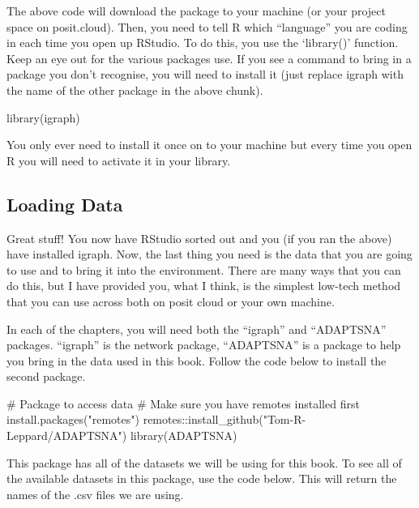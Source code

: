 \documentclass[
  letterpaper,
  DIV=11,
  numbers=noendperiod]{scrreprt}
\newenvironment{Shaded}{\begin{snugshade}}{\end{snugshade}}
\newcommand{\CommentTok}[1]{\textcolor[rgb]{0.37,0.37,0.37}{#1}}
\newcommand{\FunctionTok}[1]{\textcolor[rgb]{0.28,0.35,0.67}{#1}}
\newcommand{\NormalTok}[1]{\textcolor[rgb]{0.00,0.23,0.31}{#1}}
\newcommand{\SpecialCharTok}[1]{\textcolor[rgb]{0.37,0.37,0.37}{#1}}
\newcommand{\StringTok}[1]{\textcolor[rgb]{0.13,0.47,0.30}{#1}}
\begin{document}
The above code will download the package to your machine (or your
project space on posit.cloud). Then, you need to tell R which
``language'' you are coding in each time you open up RStudio. To do
this, you use the `library()' function. Keep an eye out for the various
packages use. If you see a command to bring in a package you don't
recognise, you will need to install it (just replace igraph with the
name of the other package in the above chunk).

\begin{Shaded}
\begin{Highlighting}[]
\FunctionTok{library}\NormalTok{(igraph)}
\end{Highlighting}
\end{Shaded}

You only ever need to install it once on to your machine but every time
you open R you will need to activate it in your library.

\subsection{Loading Data}\label{loading-data}

Great stuff! You now have RStudio sorted out and you (if you ran the
above) have installed igraph. Now, the last thing you need is the data
that you are going to use and to bring it into the environment. There
are many ways that you can do this, but I have provided you, what I
think, is the simplest low-tech method that you can use across both on
posit cloud or your own machine.

In each of the chapters, you will need both the ``igraph'' and
``ADAPTSNA'' packages. ``igraph'' is the network package, ``ADAPTSNA''
is a package to help you bring in the data used in this book. Follow the
code below to install the second package.

\begin{Shaded}
\begin{Highlighting}[]
\CommentTok{\# Package to access data}
\CommentTok{\# Make sure you have remotes installed first}
\FunctionTok{install.packages}\NormalTok{(}\StringTok{"remotes"}\NormalTok{)}
\NormalTok{remotes}\SpecialCharTok{::}\FunctionTok{install\_github}\NormalTok{(}\StringTok{"Tom{-}R{-}Leppard/ADAPTSNA"}\NormalTok{)}
\FunctionTok{library}\NormalTok{(ADAPTSNA)}
\end{Highlighting}
\end{Shaded}

This package has all of the datasets we will be using for this book. To
see all of the available datasets in this package, use the code below.
This will return the names of the .csv files we are using.
\end{document}
